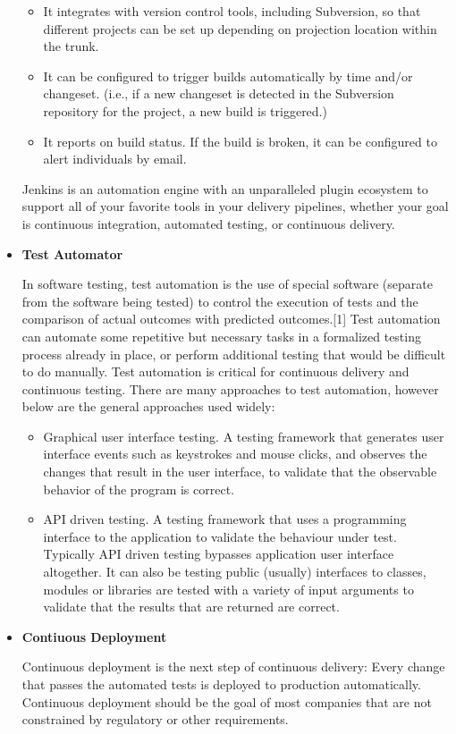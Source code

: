 \documentclass[12pt,a4paper,oneside]{report}
\begin{document}
\begin{itemize}
\begin{itemize}
\item It integrates with version control tools, including Subversion, so that different projects can be set up depending on projection location within the trunk.
\item It can be configured to trigger builds automatically by time and/or changeset. (i.e., if a new changeset is detected in the Subversion repository for the project, a new build is triggered.)
\item It reports on build status. If the build is broken, it can be configured to alert individuals by email.
\end{itemize}


Jenkins is an automation engine with an unparalleled plugin ecosystem to support all of your favorite tools in your delivery pipelines, whether your goal is continuous integration, automated testing, or continuous delivery. 
 \item  \textbf{Test Automator}
\par In software testing, test automation is the use of special software (separate from the software being tested) to control the execution of tests and the comparison of actual outcomes with predicted outcomes.[1] Test automation can automate some repetitive but necessary tasks in a formalized testing process already in place, or perform additional testing that would be difficult to do manually. Test automation is critical for continuous delivery and continuous testing. There are many approaches to test automation, however below are the general approaches used widely:

\begin{itemize}
\item Graphical user interface testing. A testing framework that generates user interface events such as keystrokes and mouse clicks, and observes the changes that result in the user interface, to validate that the observable behavior of the program is correct.
\item API driven testing. A testing framework that uses a programming interface to the application to validate the behaviour under test. Typically API driven testing bypasses application user interface altogether. It can also be testing public (usually) interfaces to classes, modules or libraries are tested with a variety of input arguments to validate that the results that are returned are correct.
\end{itemize}


\item \textbf{Contiuous Deployment}
\par Continuous deployment is the next step of continuous delivery: Every change that passes the automated tests is deployed to production automatically. Continuous deployment should be the goal of most companies that are not constrained by regulatory or other requirements.

\end{itemize}
\end{document}
